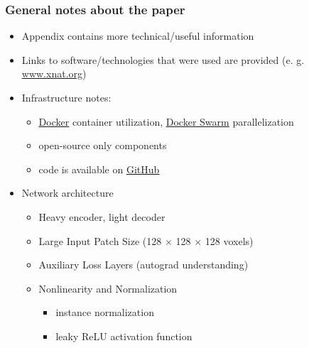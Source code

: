 \documentclass{beamer}
\begin{document}
\begin{frame}
\frametitle{General notes about the paper}
\begin{itemize}
	\item Appendix contains more technical/useful information
	\item Links to software/technologies that were used are provided (e. g. \href{https://www.xnat.org/}{{\color{blue}\underline{www.xnat.org}}})
	\item Infrastructure notes:
		\begin{itemize}
			\item \href{https://www.docker.com/}{{\color{blue}\underline{Docker}}} container utilization, \href{https://github.com/docker/swarm}{{\color{blue}\underline{Docker Swarm}}} parallelization
			\item open-source only components
			\item code is available on  \href{https://github.com/MIC-DKFZ/HD-BET}{{\color{blue}\underline{GitHub}}}
		\end{itemize}
	\item Network architecture
	\begin{itemize}
		\item Heavy encoder, light decoder
		\item Large Input Patch Size (128 $\times$ 128 $\times$ 128 voxels)
		\item Auxiliary Loss Layers (autograd understanding)
		\item Nonlinearity and Normalization
		\begin{itemize}
			\item instance normalization
			\item leaky ReLU activation function
		\end{itemize}
	\end{itemize}
\end{itemize}
\end{frame}
\end{document}
